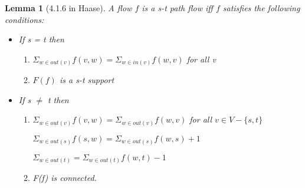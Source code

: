 \documentclass{article}
\newtheorem{lemma}{Lemma}
\begin{document}
\begin{lemma}[4.1.6 in Haase]  A flow $f$ is a \textit{s-t} path flow iff $f$ satisfies the following conditions:
\begin{itemize}
\item If s = t then
\begin{enumerate}
\item $\Sigma_{w\in out(v)} f(v,w) = \Sigma_{w\in in(v)} f(w,v)$ for all v
\item $F(f)$ is a s-t support


\end{enumerate}


\item If s $\ne$ t then
\begin{enumerate}
\item $\Sigma_{w\in out(v)} f(v,w) = \Sigma_{w\in out(v)} f(w,v)$ for all $v\in V-\{s,t\}$

$\Sigma_{w\in out(s)} f(s,w) = \Sigma_{w\in out(s)} f(w,s) + 1$

$\Sigma_{w\in out(t)} = \Sigma_{w\in out(t)} f(w,t) - 1$


\item F(f) is connected.
\end{enumerate}

\end{itemize}



\end{lemma}
\end{document}
